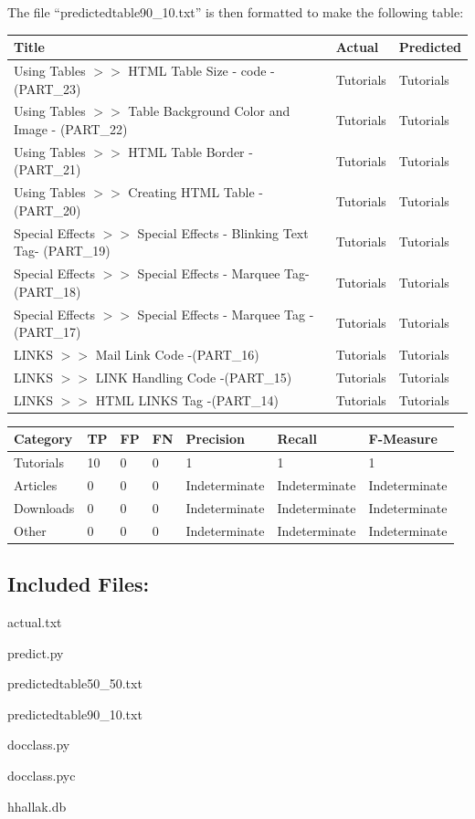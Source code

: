 \documentclass[a4paper, 11pt]{article}
\begin{document}
The file ``predictedtable90\_10.txt'' is then formatted to make the following table:

\begin{longtable}{ |p{10cm}|p{2cm}|p{2cm}| }
\hline
Title
&
Actual
&
Predicted \\
\hline
Using Tables  $>>$ HTML Table Size - code  - (PART\_23)
&
Tutorials
&
Tutorials \\
\hline
Using Tables $>>$ Table Background Color and Image - (PART\_22)
&
Tutorials
&
Tutorials \\
\hline
Using Tables $>>$ HTML Table Border - (PART\_21)
&
Tutorials
&
Tutorials \\
\hline
Using Tables $>>$ Creating HTML Table - (PART\_20)
&
Tutorials
&
Tutorials \\
\hline
Special Effects $>>$ Special Effects - Blinking Text Tag- (PART\_19)
&
Tutorials
&
Tutorials \\
\hline
Special Effects $>>$ Special Effects - Marquee Tag- (PART\_18)
&
Tutorials
&
Tutorials \\
\hline
Special Effects $>>$ Special Effects - Marquee Tag -(PART\_17)
&
Tutorials
&
Tutorials \\
\hline
LINKS $>>$ Mail Link Code -(PART\_16)
&
Tutorials
&
Tutorials \\
\hline
LINKS $>>$ LINK Handling Code  -(PART\_15)
&
Tutorials
&
Tutorials \\
\hline
LINKS  $>>$   HTML LINKS Tag  -(PART\_14)
&
Tutorials
&
Tutorials \\
\hline
\end{longtable}

\begin{longtable}{ |p{2cm}|p{0.5cm}|p{0.5cm}|p{0.5cm}|p{2.5cm}|p{2.5cm}|p{2.5cm}| }
\hline
Category
&
TP
&
FP
&
FN
&
Precision
&
Recall
&
F-Measure \\
\hline
Tutorials
&
10
&
0
&
0
&
1
&
1
&
1 \\
\hline
Articles
&
0
&
0
&
0
&
Indeterminate
&
Indeterminate
&
Indeterminate \\
\hline
Downloads
&
0
&
0
&
0
&
Indeterminate
&
Indeterminate
&
Indeterminate \\
\hline
Other
&
0
&
0
&
0
&
Indeterminate
&
Indeterminate
&
Indeterminate \\
\hline
\end{longtable}

\subsection*{Included Files:}

actual.txt

\noindent
predict.py

\noindent
predictedtable50\_50.txt

\noindent
predictedtable90\_10.txt

\noindent
docclass.py

\noindent
docclass.pyc

\noindent
hhallak.db
\end{document}
